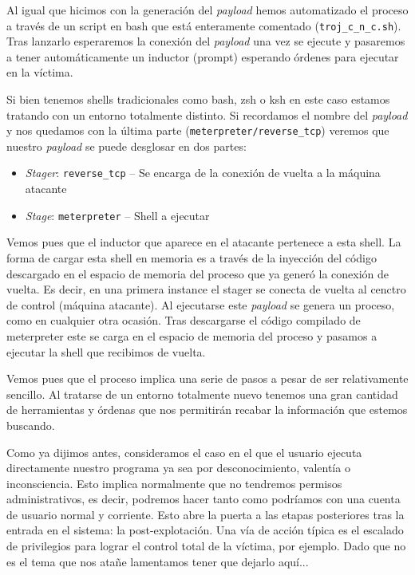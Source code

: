 \documentclass[12pt]{article}
\newcommand{\newpar} {
    \vskip 0.5cm
}
\begin{document}
                \newpar

                Al igual que hicimos con la generación del \textit{payload} hemos automatizado el proceso a través de un script en bash que está enteramente comentado (\texttt{troj\_c\_n\_c.sh}). Tras lanzarlo esperaremos la conexión del \textit{payload} una vez se ejecute y pasaremos a tener automáticamente un inductor (prompt) esperando órdenes para ejecutar en la víctima.

                \newpar

                Si bien tenemos shells tradicionales como bash, zsh o ksh en este caso estamos tratando con un entorno totalmente distinto. Si recordamos el nombre del \textit{payload} y nos quedamos con la última parte (\texttt{meterpreter/reverse\_tcp}) veremos que nuestro \textit{payload} se puede desglosar en dos partes:

                \begin{itemize}
                    \item \textit{Stager}: \texttt{reverse\_tcp} -- Se encarga de la conexión de vuelta a la máquina atacante
                    \item \textit{Stage}: \texttt{meterpreter} -- Shell a ejecutar
                \end{itemize}

                Vemos pues que el inductor que aparece en el atacante pertenece a esta shell. La forma de cargar esta shell en memoria es a través de la inyección del código descargado en el espacio de memoria del proceso que ya generó la conexión de vuelta. Es decir, en una primera instance el stager se conecta de vuelta al cenctro de control (máquina atacante). Al ejecutarse este \textit{payload} se genera un proceso, como en cualquier otra ocasión. Tras descargarse el código compilado de meterpreter este se carga en el espacio de memoria del proceso y pasamos a ejecutar la shell que recibimos de vuelta.

                \newpar

                Vemos pues que el proceso implica una serie de pasos a pesar de ser relativamente sencillo. Al tratarse de un entorno totalmente nuevo tenemos una gran cantidad de herramientas y órdenas que nos permitirán recabar la información que estemos buscando.

                \newpar

                Como ya dijimos antes, consideramos el caso en el que el usuario ejecuta directamente nuestro programa ya sea por desconocimiento, valentía o inconsciencia. Esto implica normalmente que no tendremos permisos administrativos, es decir, podremos hacer tanto como podríamos con una cuenta de usuario normal y corriente. Esto abre la puerta a las etapas posteriores tras la entrada en el sistema: la post-explotación. Una vía de acción típica es el escalado de privilegios para lograr el control total de la víctima, por ejemplo. Dado que no es el tema que nos atañe lamentamos tener que dejarlo aquí...
\end{document}
